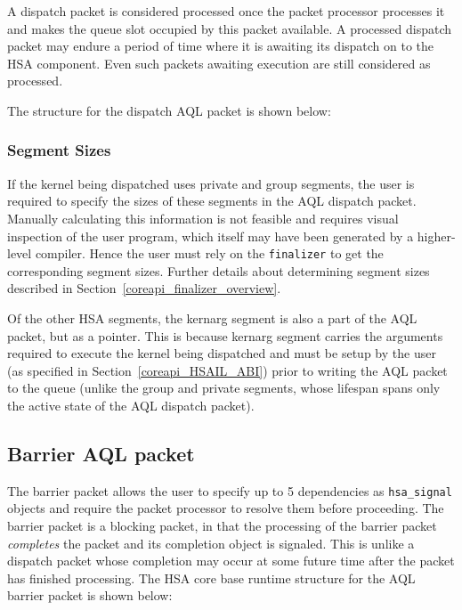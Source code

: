 A dispatch packet is considered processed once the packet processor
processes it and makes the queue slot occupied by this packet
available. A processed dispatch packet may endure a period of time
where it is awaiting its dispatch on to the HSA component. Even such
packets awaiting execution are still considered as processed. 

The structure for the dispatch AQL packet is shown below:



\hypertarget{segment_sizes}{}\subsubsection{Segment
Sizes}\label{segment_sizes}
If the kernel being dispatched uses private and group segments, the
user is required to specify the sizes of these segments in the AQL
dispatch packet. Manually calculating this information is not 
feasible and requires visual inspection of the user program, which itself
may have been generated by a higher-level compiler. Hence the user
must rely on the \texttt{finalizer} to get the corresponding segment
sizes. Further details about determining segment sizes described in
Section~\ref{coreapi_finalizer_overview}. 

Of the other HSA segments, the kernarg segment is also a part of
the AQL packet, but as a pointer. This is because kernarg segment
carries the arguments required to execute the kernel being
dispatched and must be setup by the user (as specified in
Section~\ref{coreapi_HSAIL_ABI}) prior to writing the AQL packet to
the queue (unlike the group and private segments, whose lifespan
spans only the active state of the AQL dispatch packet).

\hypertarget{barrier_packet}{}\subsection{Barrier AQL
packet}\label{barrier_packet} 
The barrier packet allows the user to specify up to 5 dependencies
as \texttt{hsa\_signal} objects and require the packet processor to
resolve them before proceeding. The barrier packet is a blocking
packet, in that the processing of the barrier packet
\emph{completes} the packet and its completion object is signaled.
This is unlike a dispatch packet whose completion may occur at some
future time after the packet has finished processing. The HSA core
base runtime structure for the AQL barrier packet is shown below:

